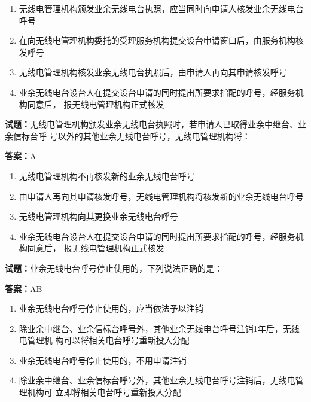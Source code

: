 \documentclass{ctexbook}
\begin{document}
\begin{enumerate}[leftmargin=3em]
  \item 无线电管理机构颁发业余无线电台执照，应当同时向申请人核发业余无线电台呼号 

  \item 在向无线电管理机构委托的受理服务机构提交设台申请窗口后，由服务机构核发呼号 

  \item 无线电管理机构核发业余无线电台执照后，由申请人再向其申请核发呼号 


  \item 业余无线电台设台人在提交设台申请的同时提出所要求指配的呼号，经服务机构同意后，
报无线电管理机构正式核发 

\end{enumerate}





\vspace{1em}

\textbf{试题：}无线电管理机构颁发业余无线电台执照时，若申请人已取得业余中继台、业余信标台呼
号以外的其他业余无线电台呼号，无线电管理机构将： 

\textbf{答案：}A 

\begin{enumerate}[leftmargin=3em]
  \item 无线电管理机构不再核发新的业余无线电台呼号 

  \item 由申请人再向其申请核发呼号，无线电管理机构将核发新的业余无线电台呼号 

  \item 无线电管理机构向其更换业余无线电台呼号 

  \item 业余无线电台设台人在提交设台申请的同时提出所要求指配的呼号，经服务机构同意后，
报无线电管理机构正式核发 

\end{enumerate}





\vspace{1em}

\textbf{试题：}业余无线电台呼号停止使用的，下列说法正确的是： 

\textbf{答案：}AB 

\begin{enumerate}[leftmargin=3em]
  \item 业余无线电台呼号停止使用的，应当依法予以注销 

  \item 除业余中继台、业余信标台呼号外，其他业余无线电台呼号注销1年后，无线电管理机
构可以将相关电台呼号重新投入分配 

  \item 业余无线电台呼号停止使用的，不用申请注销 

  \item 除业余中继台、业余信标台呼号外，其他业余无线电台呼号注销后，无线电管理机构可
立即将相关电台呼号重新投入分配 

\end{enumerate}
\end{document}
